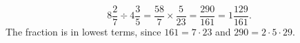 \[8\dfrac27\div4\dfrac35=\dfrac{58}7\times\dfrac5{23}=\dfrac{290}{161}=\boxed{1\dfrac{129}{161}}.\]
The fraction is in lowest terms, since $161=7\cdot23$ and $290=2\cdot5\cdot29$.
